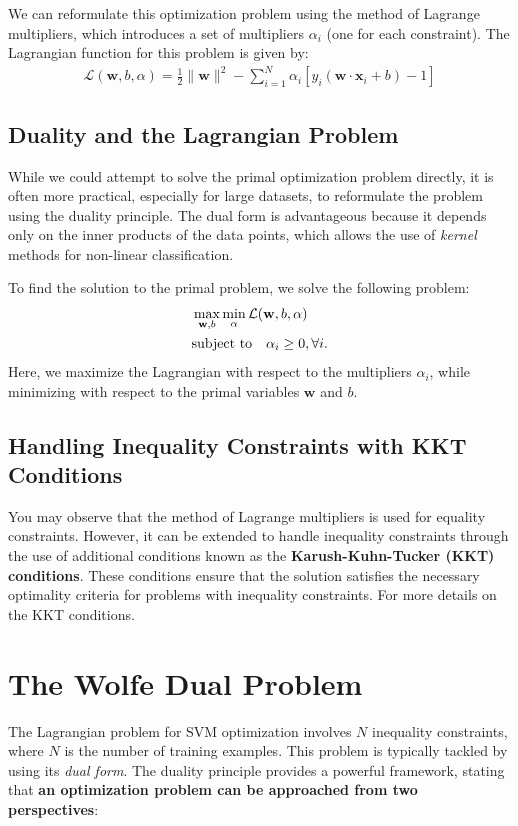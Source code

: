 We can reformulate this optimization problem using the method of Lagrange multipliers, which introduces a set of multipliers $\alpha_i$ (\cf one for each constraint). The Lagrangian function for this problem is given by:
\begin{align*}
	\mathcal{L}(\mathbf{w}, b, \alpha) = \frac{1}{2}\lVert \mathbf{w}\rVert ^2 - \sum_{i=1}^N \alpha_i \left[y_i(\mathbf{w}\cdot \mathbf{x}_i+b)-1\right]
\end{align*}

\subsection{Duality and the Lagrangian Problem}

While we could attempt to solve the primal optimization problem directly, it is often more practical, especially for large datasets, to reformulate the problem using the duality principle. The dual form is advantageous because it depends only on the inner products of the data points, which allows the use of \textit{kernel} methods for non-linear classification.

To find the solution to the primal problem, we solve the following problem:
\begin{align*}
	&\max_{\mathbf{w}, b}\min_\alpha \mathcal{L}({\mathbf{w}}, b, \alpha)\\
	&\textrm{subject to}\quad \alpha_i\geq 0, \forall i.
\end{align*}
Here, we maximize the Lagrangian with respect to the multipliers $\alpha_i$, while minimizing with respect to the primal variables $\mathbf{w}$ and $b$.

\subsection{Handling Inequality Constraints with KKT Conditions}

You may observe that the method of Lagrange multipliers is used for equality constraints. However, it can be extended to handle inequality constraints through the use of additional conditions known as the \textbf{Karush-Kuhn-Tucker (KKT) conditions}. These conditions ensure that the solution satisfies the necessary optimality criteria for problems with inequality constraints. For more details on the KKT conditions. 

\section{The Wolfe Dual Problem}
The Lagrangian problem for SVM optimization involves $N$ inequality constraints, where $N$ is the number of training examples. This problem is typically tackled by using its \textit{dual form}. The duality principle provides a powerful framework, stating that \textbf{an optimization problem can be approached from two perspectives}: 

